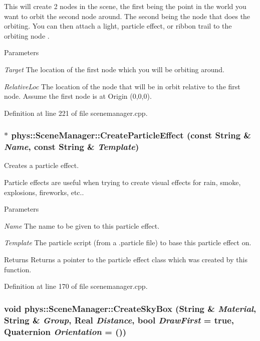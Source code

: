 This will create 2 nodes in the scene, the first being the point in the world you want to orbit the second node around. The second being the node that does the orbiting. You can then attach a light, particle effect, or ribbon trail to the orbiting node . 
\begin{DoxyParams}{Parameters}
\item[{\em Target}]The location of the first node which you will be orbiting around. \item[{\em RelativeLoc}]The location of the node that will be in orbit relative to the first node. Assume the first node is at Origin (0,0,0). \end{DoxyParams}


Definition at line 221 of file scenemanager.cpp.

\hypertarget{classphys_1_1SceneManager_a67a33ba38c8e8b198c52ca7bcf847751}{
\subsubsection[{CreateParticleEffect}]{ $\ast$ phys::SceneManager::CreateParticleEffect (const {\bf String} \& {\em Name}, \/  const {\bf String} \& {\em Template})}}
\label{dd/da8/classphys_1_1SceneManager_a67a33ba38c8e8b198c52ca7bcf847751}


Creates a particle effect. 

Particle effects are useful when trying to create visual effects for rain, smoke, explosions, fireworks, etc.. 
\begin{DoxyParams}{Parameters}
\item[{\em Name}]The name to be given to this particle effect. \item[{\em Template}]The particle script (from a .particle file) to base this particle effect on. \end{DoxyParams}
\begin{DoxyReturn}{Returns}
Returns a pointer to the particle effect class which was created by this function. 
\end{DoxyReturn}


Definition at line 170 of file scenemanager.cpp.

\hypertarget{classphys_1_1SceneManager_a0adfdec14b8b3c19fd0ce95b0933dc99}{
\subsubsection[{CreateSkyBox}]{\setlength{\rightskip}{0pt plus 5cm}void phys::SceneManager::CreateSkyBox ({\bf String} \& {\em Material}, \/  {\bf String} \& {\em Group}, \/  {\bf Real} {\em Distance}, \/  bool {\em DrawFirst} = {\ttfamily true}, \/  {\bf Quaternion} {\em Orientation} = {()})}}
\label{dd/da8/classphys_1_1SceneManager_a0adfdec14b8b3c19fd0ce95b0933dc99}


